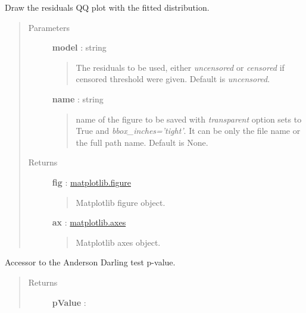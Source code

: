 \documentclass[letterpaper,10pt,english]{sphinxmanual}
\begin{document}
\begin{fulllineitems}
\begin{fulllineitems}
\label{_generated/otpod.UnivariateLinearModelAnalysis:otpod.UnivariateLinearModelAnalysis.drawResidualsQQplot}
Draw the residuals QQ plot with the fitted distribution.
\begin{quote}\begin{description}
\item[{Parameters}] \leavevmode
\textbf{model} : string
\begin{quote}

The residuals to be used, either \emph{uncensored} or
\emph{censored} if censored threshold were given. Default is \emph{uncensored}.
\end{quote}

\textbf{name} : string
\begin{quote}

name of the figure to be saved with \emph{transparent} option sets to True
and \emph{bbox\_inches='tight'}. It can be only the file name or the 
full path name. Default is None.
\end{quote}

\item[{Returns}] \leavevmode
\textbf{fig} : \href{http://matplotlib.org/api/figure\_api.html}{matplotlib.figure}
\begin{quote}

Matplotlib figure object.
\end{quote}

\textbf{ax} : \href{http://matplotlib.org/api/axes\_api.html}{matplotlib.axes}
\begin{quote}

Matplotlib axes object.
\end{quote}

\end{description}\end{quote}

\end{fulllineitems}


\begin{fulllineitems}
\label{_generated/otpod.UnivariateLinearModelAnalysis:otpod.UnivariateLinearModelAnalysis.getAndersonDarlingPValue}
Accessor to the Anderson Darling test p-value.
\begin{quote}\begin{description}
\item[{Returns}] \leavevmode
\textbf{pValue} : \href{http://doc.openturns.org/openturns-latest/sphinx/user\_manual/\_generated/openturns.NumericalPoint.html\#openturns.NumericalPoint}{}
\begin{quote}


\end{quote}
\end{description}
\end{quote}
\end{fulllineitems}
\end{fulllineitems}
\end{document}
